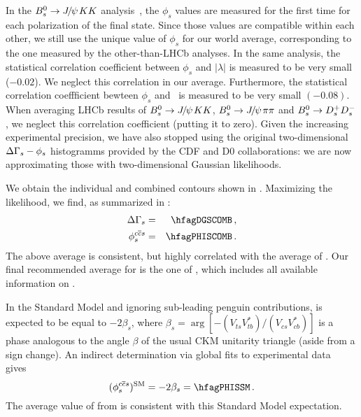 In  the  $B^0_s \to {J\mskip -3mu/\mskip -2mu\psi\mskip 2mu} KK$ analysis~\cite{LHCB-PAPER-2014-059,*Aaij:2013oba_supersede2}, the $\phi_s$ values are measured for the first time for each polarization of the final state. Since those values are compatible within each other, we still use the unique value of $\phi_s$ for our world average, corresponding to the one measured by the other-than-LHCb analyses. 
In the same analysis, the statistical correlation coefficient between $\phi_s$ and $|\lambda|$ is measured to be very small ($-0.02$). We neglect this correlation in our average. 
Furthermore, the statistical correlation coeffficient bewteen $\phi_s$ and \DGs\ is measured to be very small $(-0.08)$. When averaging LHCb results of 
$B^0_s \to {J\mskip -3mu/\mskip -2mu\psi\mskip 2mu} KK$,  $B^0_s \to {J\mskip -3mu/\mskip -2mu\psi\mskip 2mu} \pi\pi$ and $B^0_s \to D_s^+ D_s^-$, we neglect this correlation coefficient (putting it to zero). 
Given the increasing experimental precision, we have also stopped using the original two-dimensional $\Delta\Gamma_{s}-\phi_s$ histogramms provided by the CDF and D0 collaborations: we are now approximating those with two-dimensional Gaussian likelihoods. 

We obtain the individual and combined contours shown in . %
Maximizing the likelihood, we find, as summarized in :  
\begin{eqnarray}
\DGs &=& \hfagDGSCOMB \,, \\    
\phiccbars &=& \hfagPHISCOMB \,.
\labe{phis}
\end{eqnarray}
The above \DGs average is consistent, but highly correlated with the average
of . Our
final recommended average for \DGs is the one of , which 
includes all available information on \DGs. 

In the Standard Model and ignoring sub-leading penguin contributions, 
\phiccbars is expected to be equal to $-2\beta_s$, 
where
$\beta_s = \arg\left[-\left(V_{ts}V^*_{tb}\right)/\left(V_{cs}V^*_{cb}\right)\right]$ %
is a phase analogous to the angle $\beta$ of the usual CKM
unitarity triangle (aside from a sign change). %
An indirect determination via global fits to experimental data
gives~\cite{Charles:2011va_mod}
\begin{equation}
(\phiccbars)^{\rm SM} = -2\beta_s = \hfagPHISSM \,.
\labe{phisSM}
\end{equation}
The average value of \phiccbars from  is consistent with this
Standard Model expectation.

